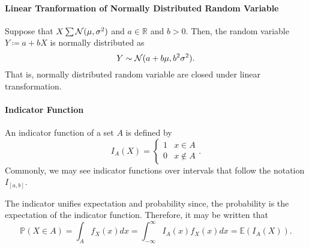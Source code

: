 \paragraph{Linear Tranformation of Normally Distributed Random Variable}
Suppose that \(X \sum \mathcal{N}(\mu, \sigma^2)\)
and \(a \in \mathbb{R}\) and \(b > 0\).
Then, the random variable \(Y \coloneqq a + bX\) is normally
distributed as
\[
    Y\sim \mathcal{N}(a + b\mu, b^2 \sigma^2).
\]
That is, normally distributed random variable are closed
under linear transformation.

\paragraph{Indicator Function}
An indicator function of a set \(A\) is defined by \[ 
    I_A(X) = \begin{cases}
        1 & x \in A \\
        0 & x \not\in A
    \end{cases}
.\]
Commonly, we may see indicator functions over intervals that follow the notation
\(I_{[a, b]}\).

The indicator unifies expectation and probability since, the probability
is the expectation of the indicator function.
Therefore, it may be written that \[
    \mathbb{P}(X\in A) = \int_{A} f_X(x)dx
    = \int_{-\infty}^{\infty} I_A(x) f_X(x) dx = \mathbb{E}(I_A(X))
.\]

